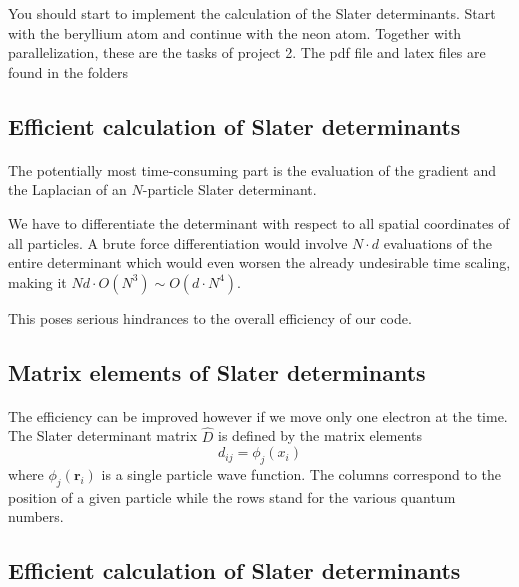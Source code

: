 \documentclass[%
twoside,                 %
final,                   %
10pt]{article}
\begin{document}
\noindent
You should start to implement the calculation of the Slater determinants. Start with the beryllium atom and
continue with the neon atom. Together with parallelization, these are the tasks of project 2. The pdf file and latex files are found in the folders




\subsection*{Efficient calculation of Slater determinants}

\paragraph{}
The potentially most time-consuming part is the
evaluation of the gradient and the Laplacian of an $N$-particle  Slater
determinant. 

We have to differentiate the determinant with respect to
all spatial coordinates of all particles. A brute force
differentiation would involve $N\cdot d$ evaluations of the entire
determinant which would even worsen the already undesirable time
scaling, making it $Nd\cdot O(N^3)\sim O(d\cdot N^4)$.

This poses serious hindrances to the overall efficiency of our code.




\subsection*{Matrix elements of Slater determinants}

\paragraph{}
The efficiency can be improved however if we move only one electron at the time.
The Slater determinant matrix $\hat{D}$ is defined by the matrix elements
\[
d_{ij}=\phi_j(x_i)
\]
where $\phi_j(\mathbf{r}_i)$ is a single particle  wave function.
The columns correspond to the position of a given particle 
while the rows stand for the various quantum numbers.



\subsection*{Efficient calculation of Slater determinants}
\end{document}
